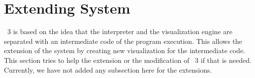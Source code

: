 \section{Extending \jel{} System}
\label{sec:Extending_Jeliot_System}

\jel{}~3 is based on the idea that the interpreter and the visualization engine are separated with an intermediate code of the program execution. This allows the extension of the system by creating new visualization for the intermediate code. This section tries to help the extension or the modification of \jel{}~3 if that is needed. Currently, we have not added any subsection here for the extensions.